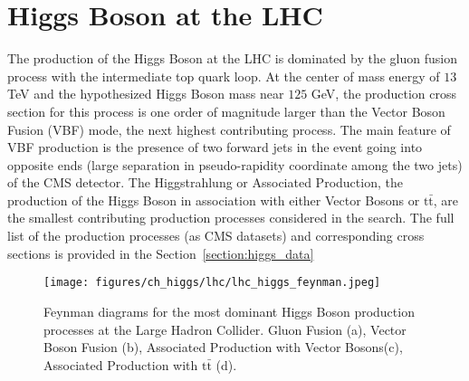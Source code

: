 \section{Higgs Boson at the LHC} \label{section:higgs_higgsatlhc}
The production of the Higgs Boson at the LHC is dominated by the gluon fusion process with the intermediate top quark loop. At the center of mass energy of $13$ TeV and the hypothesized Higgs Boson mass near $125$ GeV, the production cross section for this process is one order of magnitude larger than the Vector Boson Fusion (VBF) mode, the next highest contributing process. The main feature of VBF production is the presence of two forward jets in the event going into opposite ends (large separation in pseudo-rapidity coordinate among the two jets) of the CMS detector. The Higgstrahlung or Associated Production, the production of the Higgs Boson in association with either Vector Bosons or $\mathrm{t\bar{t}}$, are the smallest contributing production processes considered in the search. The full list of the production processes (as CMS datasets) and corresponding cross sections is provided in the Section~\ref{section:higgs_data}
\begin{figure}[hbp]
    \centering
    \texttt{[image: figures/ch\_higgs/lhc/lhc\_higgs\_feynman.jpeg]}
    \caption{Feynman diagrams for the most dominant Higgs Boson production processes at the Large Hadron Collider. Gluon Fusion (a), Vector Boson Fusion (b), Associated Production with Vector Bosons(c), Associated Production with $\mathrm{t\bar{t}}$ (d).}
\label{fig:higgs_cms_lhc}
\end{figure}


